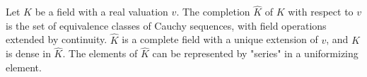 Let $K$ be a field with a real valuation $v$. The completion $\hat{K}$ of $K$ with respect to $v$ is the set of equivalence classes of Cauchy sequences, with field operations extended by continuity. $\hat{K}$ is a complete field with a unique extension of $v$, and $K$ is dense in $\hat{K}$. The elements of $\hat{K}$ can be represented by "series" in a uniformizing element.
